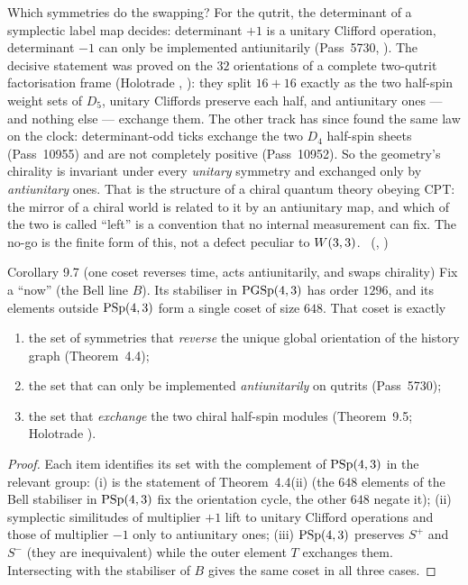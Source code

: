 \begin{physical}
Which symmetries do the swapping? For the qutrit, the determinant of a symplectic label map
decides: determinant $+1$ is a unitary Clifford operation, determinant $-1$ can only be
implemented antiunitarily (Pass~5730,
). The decisive statement was
proved on the $32$ orientations of a complete two-qutrit factorisation frame (Holotrade
, ): they split
$16+16$ exactly as the two half-spin weight sets of $D_5$, unitary Cliffords preserve each
half, and antiunitary ones --- and nothing else --- exchange them. The other track has since
found the same law on the clock: determinant-odd ticks exchange the two $D_4$ half-spin
sheets (Pass~10955) and are not completely positive (Pass~10952). So the geometry's
chirality is invariant under every \emph{unitary} symmetry and exchanged only by
\emph{antiunitary} ones. That is the structure of a chiral quantum theory obeying CPT:
the mirror of a chiral world is related to it by an antiunitary map, and which of the two is
called ``left'' is a convention that no internal measurement can fix. The no-go is the
finite form of this, not a defect peculiar to $W(3,3)$. \tierB\
(,
\cert{w33\_pass10955\_d4\_halfspin\_clock\_bridge.py})
\end{physical}

\begin{result}{Corollary 9.7 (one coset reverses time, acts antiunitarily, and swaps chirality) \hfill \tierT}
Fix a ``now'' (the Bell line $B$). Its stabiliser in $\mathrm{PGSp}(4,3)$ has order $1296$, and
its elements outside $\mathrm{PSp}(4,3)$ form a single coset of size $648$. That coset is exactly
\begin{enumerate}[label=(\roman*),leftmargin=1.5em]
\item the set of symmetries that \emph{reverse} the unique global orientation of the
      history graph (Theorem~4.4);
\item the set that can only be implemented \emph{antiunitarily} on qutrits (Pass~5730);
\item the set that \emph{exchange} the two chiral half-spin modules (Theorem~9.5;
      Holotrade \cert{e92a047}).
\end{enumerate}
\end{result}

\begin{proof}
Each item identifies its set with the complement of $\mathrm{PSp}(4,3)$ in the relevant group:
(i) is the statement of Theorem~4.4(ii) (the $648$ elements of the Bell stabiliser in
$\mathrm{PSp}(4,3)$ fix the orientation cycle, the other $648$ negate it); (ii) symplectic similitudes of
multiplier $+1$ lift to unitary Clifford operations and those of multiplier $-1$ only to
antiunitary ones; (iii) $\mathrm{PSp}(4,3)$ preserves $S^+$ and $S^-$ (they are inequivalent) while the
outer element $T$ exchanges them. Intersecting with the stabiliser of $B$ gives the same coset
in all three cases.
\end{proof}

